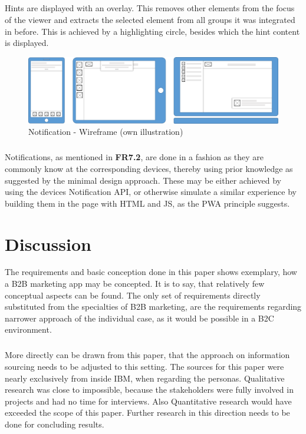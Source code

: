 \paragraph{}
Hints are displayed with an overlay. This removes other elements from the focus of the viewer and extracts the selected element from all groups it was integrated in before. This is achieved by a highlighting circle, besides which the hint content is displayed.
\begin{figure}[H]
    \centering
    \includegraphics[width=\textwidth]{img/diagrams/wireframes/notification.png}
    \caption[Notification - Wireframe]{Notification - Wireframe (own illustration)}
    \label{fig:}
\end{figure}
\paragraph{}
Notifications, as mentioned in \textbf{FR7.2}, are done in a fashion as they are commonly know at the corresponding devices, thereby using prior knowledge as suggested by the minimal design approach. These may be either achieved by using the devices Notification API, or otherwise simulate a similar experience by building them in the page with HTML and JS, as the PWA principle suggests.
\chapter{Discussion}
The requirements and basic conception done in this paper shows exemplary, how a B2B marketing app may be concepted. It is to say, that relatively few conceptual aspects can be found. The only set of requirements directly substituted from the specialties of B2B marketing, are the requirements regarding narrower approach of the individual case, as it would be possible in a B2C environment. 

\paragraph{} More directly can be drawn from this paper, that the approach on information sourcing needs to be adjusted to this setting. The sources for this paper were nearly exclusively from inside IBM, when regarding the personas. Qualitative research was close to impossible, because the stakeholders were fully involved in projects and had no time for interviews. Also Quantitative research would have exceeded the scope of this paper. Further research in this direction needs to be done for concluding results. 

